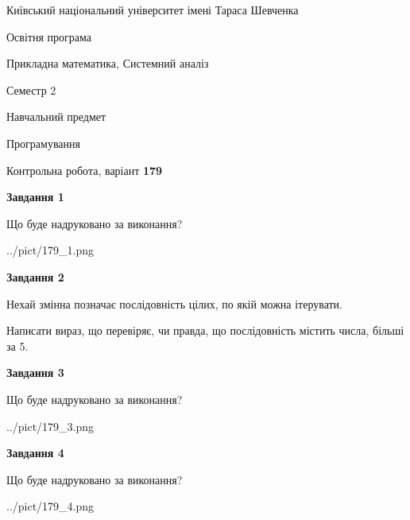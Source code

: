 \documentclass[12pt, ukrainian]{article}
\begin{document}
{{\begin {small}\par
{ \center  Київський національний університет імені Тараса Шевченка \par}
{\parbox {5 cm}{Освітня програма \hfill}{\parbox {8 cm}{Прикладна математика, Системний аналіз \hfill}}\parbox {5 cm}{\hfill Семестр 2}}\par
{\parbox {5 cm} {Навчальний предмет \hfill}\parbox {7 cm}{Програмування \hfill}\parbox {6cm}{\hfill}\par}\vspace{-7pt} \end{small}}{\center Контрольна робота, варіант  \No \textbf
{ 179 }\par}}
{
\begin {large}
{\begin {center}\textbf{Завдання 1}\end {center}}\par
Що буде надруковано за виконання?\par\par
\begin{center}
	{../pict/179_1.png}
\end{center}
\newpage

{\begin {center}\textbf{Завдання 2}\end {center}}\par
Нехай змінна  позначає послідовність цілих, по якій можна ітерувати.

Написати вираз, що перевіряє, чи правда, що послідовність  містить числа, більші за 5.\par
\newpage

{\begin {center}\textbf{Завдання 3}\end {center}}\par
Що буде надруковано за виконання?\par
\begin{center}
	{../pict/179_3.png}
\end{center}
\newpage

{\begin {center}\textbf{Завдання 4}\end {center}}\par
Що буде надруковано за виконання?\par
\begin{center}
	{../pict/179_4.png}
\end{center}
\newpage


\end{large}}
\end{document}
